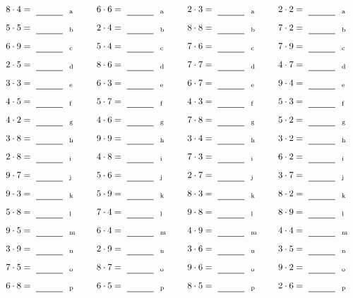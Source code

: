 \documentclass
[
  draft    = true,
  fontsize = 11pt,
  parskip  = half-
]
{scrartcl}
\begin{document}
\par\vfill\par
\begin{align*}
    \pline{8\cdot4}&=\rline{a}
  & \pline{6\cdot6}&=\rline{a}
  & \pline{2\cdot3}&=\rline{a}
  & \pline{2\cdot2}&=\rline{a} \\[1ex]
    \pline{5\cdot5}&=\rline{b}
  & \pline{2\cdot4}&=\rline{b}
  & \pline{8\cdot8}&=\rline{b}
  & \pline{7\cdot2}&=\rline{b} \\[1ex]
    \pline{6\cdot9}&=\rline{c}
  & \pline{5\cdot4}&=\rline{c}
  & \pline{7\cdot6}&=\rline{c}
  & \pline{7\cdot9}&=\rline{c} \\[1ex]
    \pline{2\cdot5}&=\rline{d}
  & \pline{8\cdot6}&=\rline{d}
  & \pline{7\cdot7}&=\rline{d}
  & \pline{4\cdot7}&=\rline{d} \\[1ex]
    \pline{3\cdot3}&=\rline{e}
  & \pline{6\cdot3}&=\rline{e}
  & \pline{6\cdot7}&=\rline{e}
  & \pline{9\cdot4}&=\rline{e} \\[1ex]
    \pline{4\cdot5}&=\rline{f}
  & \pline{5\cdot7}&=\rline{f}
  & \pline{4\cdot3}&=\rline{f}
  & \pline{5\cdot3}&=\rline{f} \\[1ex]
    \pline{4\cdot2}&=\rline{g}
  & \pline{4\cdot6}&=\rline{g}
  & \pline{7\cdot8}&=\rline{g}
  & \pline{5\cdot2}&=\rline{g} \\[1ex]
    \pline{3\cdot8}&=\rline{h}
  & \pline{9\cdot9}&=\rline{h}
  & \pline{3\cdot4}&=\rline{h}
  & \pline{3\cdot2}&=\rline{h} \\[1ex]
    \pline{2\cdot8}&=\rline{i}
  & \pline{4\cdot8}&=\rline{i}
  & \pline{7\cdot3}&=\rline{i}
  & \pline{6\cdot2}&=\rline{i} \\[1ex]
    \pline{9\cdot7}&=\rline{j}
  & \pline{5\cdot6}&=\rline{j}
  & \pline{2\cdot7}&=\rline{j}
  & \pline{3\cdot7}&=\rline{j} \\[1ex]
    \pline{9\cdot3}&=\rline{k}
  & \pline{5\cdot9}&=\rline{k}
  & \pline{8\cdot3}&=\rline{k}
  & \pline{8\cdot2}&=\rline{k} \\[1ex]
    \pline{5\cdot8}&=\rline{l}
  & \pline{7\cdot4}&=\rline{l}
  & \pline{9\cdot8}&=\rline{l}
  & \pline{8\cdot9}&=\rline{l} \\[1ex]
    \pline{9\cdot5}&=\rline{m}
  & \pline{6\cdot4}&=\rline{m}
  & \pline{4\cdot9}&=\rline{m}
  & \pline{4\cdot4}&=\rline{m} \\[1ex]
    \pline{3\cdot9}&=\rline{n}
  & \pline{2\cdot9}&=\rline{n}
  & \pline{3\cdot6}&=\rline{n}
  & \pline{3\cdot5}&=\rline{n} \\[1ex]
    \pline{7\cdot5}&=\rline{o}
  & \pline{8\cdot7}&=\rline{o}
  & \pline{9\cdot6}&=\rline{o}
  & \pline{9\cdot2}&=\rline{o} \\[1ex]
    \pline{6\cdot8}&=\rline{p}
  & \pline{6\cdot5}&=\rline{p}
  & \pline{8\cdot5}&=\rline{p}
  & \pline{2\cdot6}&=\rline{p}
\end{align*}
\end{document}
